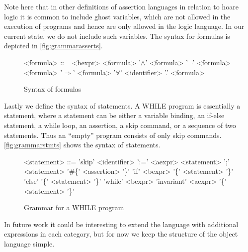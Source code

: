 Note here that in other definitions of assertion languages in relation to hoare logic it is
common to include ghost variables, which are not allowed in the execution of programs and hence
are only allowed in the logic language. In our current state, we do not include such variables.
The syntax for formulas is depicted in \autoref{fig:grammarasserts}.
\begin{figure}[H]
\centering
\begin{grammar}
<formula> ::= <bexpr>
\alt <formula> '$\wedge$' <formula>
\alt '$\neg$' <formula>
\alt <formula> '$\Rightarrow$' <formula>
\alt '$\forall$' <identifier> '.' <formula>
\end{grammar}
\caption{Syntax of formulas}
\label{fig:grammarasserts}
\end{figure}

Lastly we define the syntax of statements. A WHILE program is essentially a statement, where
a statement can be either a variable binding, an if-else statement, a while loop, an assertion,
a skip command, or a sequence of two statements. Thus an ``empty'' program consists of only
skip commands. \autoref{fig:grammarstmts} shows the syntax of statements.

\begin{figure}[H]
\centering
\begin{grammar}
<statement> ::= 'skip'
\alt <identifier> ':=' <aexpr>
\alt <statement> ';' <statement>
\alt '\#\{' <assertion> '\}'
\alt 'if' <bexpr> '\{' <statement> '\}' 'else' '\{' <statement> '\}'
\alt 'while' <bexpr> 'invariant' <aexpr> '\{' <statement> '\}'
\end{grammar}
\caption{Grammar for a WHILE program}
\label{fig:grammarstmts}
\end{figure}

In future work it could be interesting to extend the language with additional expressions in each category, but for now we keep the structure of the object language simple.
